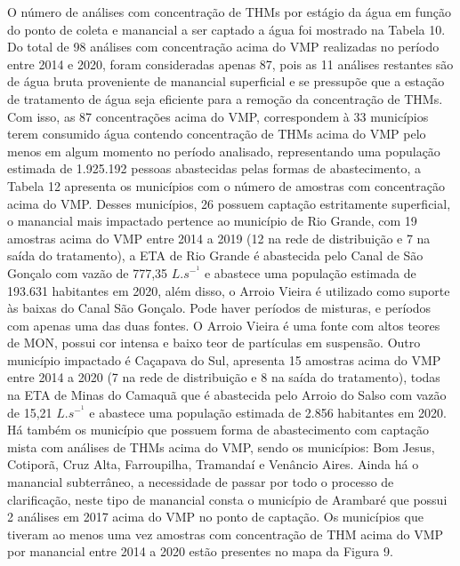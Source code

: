 O número de análises com concentração de THMs por estágio da água em função do ponto de coleta e manancial a ser captado a água foi mostrado na Tabela 10.
Do total de 98 análises com concentração acima do VMP realizadas no período entre 2014 e 2020, foram consideradas apenas 87,  pois as 11 análises restantes são de água bruta proveniente de manancial superficial e se pressupõe que a estação de tratamento de água seja eficiente para a remoção da concentração de THMs. Com isso, as 87 concentrações acima do VMP, correspondem à 33 municípios terem consumido água contendo concentração de THMs acima do VMP pelo menos em algum momento no período analisado, representando uma população estimada de 1.925.192 pessoas abastecidas pelas formas de abastecimento, a Tabela 12 apresenta os municípios com o número de amostras com concentração acima do VMP. Desses municípios, 26 possuem captação estritamente superficial, o manancial mais impactado pertence ao município de Rio Grande, com 19 amostras acima do VMP entre 2014 a 2019 (12 na rede de distribuição e 7 na saída do tratamento), a ETA de Rio Grande é abastecida pelo Canal de São Gonçalo com vazão de 777,35 $L.s^-^1$ e abastece uma população estimada de 193.631 habitantes em 2020, além disso, o Arroio Vieira é utilizado como suporte às baixas do Canal São Gonçalo. Pode haver períodos de misturas, e períodos com apenas uma das duas fontes. O Arroio Vieira é uma fonte com altos teores de MON, possui cor intensa e baixo teor de partículas em suspensão. Outro município impactado é Caçapava do Sul, apresenta 15 amostras acima do VMP entre 2014 a 2020 (7 na rede de distribuição e 8 na saída do tratamento), todas na ETA de Minas do Camaquã que é abastecida pelo Arroio do Salso com vazão de 15,21 $L.s^-^1$ e abastece uma população estimada de 2.856 habitantes em 2020. Há também os município que possuem forma de abastecimento com captação mista com análises de THMs acima do VMP, sendo os municípios: Bom Jesus, Cotiporã, Cruz Alta, Farroupilha, Tramandaí e Venâncio Aires. Ainda há o manancial subterrâneo, a necessidade de passar por todo o processo de clarificação, neste tipo de manancial consta o município de Arambaré que possui 2 análises em 2017 acima do VMP no ponto de captação. Os municípios que tiveram ao menos uma vez amostras com concentração de THM acima do VMP por manancial entre 2014 a 2020 estão presentes no mapa da Figura 9.





\newpage

